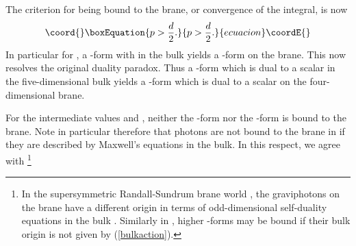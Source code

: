 \documentclass[a4paper,12pt]{article}
\begin{document}
%
The criterion for being bound to the brane, or convergence of the \coordHE{}
integral, is now
%
\begin{equation}\coord{}\boxEquation{
p>\frac{d}{2}.
\label{newconverge}
}{
p>\frac{d}{2}.
}{ecuacion}\coordE{}\end{equation}
%
In particular for \coordHE{}, a \coordHE{}-form with \coordHE{} in the bulk yields a
\coordHE{}-form on the brane. This now resolves the original
duality paradox. Thus a \coordHE{}-form which is dual to a scalar in
the five-dimensional bulk yields a \coordHE{}-form which is dual to a scalar
on the four-dimensional brane.

For the intermediate values \coordHE{} and \coordHE{}, neither the
\coordHE{}-form nor the \coordHE{}-form is bound to the brane. Note in particular
therefore that photons are not bound to the brane in \coordHE{} if they
are described by Maxwell's equations in the bulk. In this respect, we
agree with \cite{Bajc:2000mh,kaloper}%
%
\footnote{In the supersymmetric Randall-Sundrum brane world
\cite{Bremer,Duffliu,DLS}, the graviphotons on the \coordHE{} brane have a
different origin in terms of odd-dimensional self-duality equations
in the bulk \cite{lupope,Duffliu2,Cvetic:2000gj}. Similarly in \coordHE{}, higher
\coordHE{}-forms may be bound if their bulk origin is not given by
(\ref{bulkaction}).}
%
\end{document}
